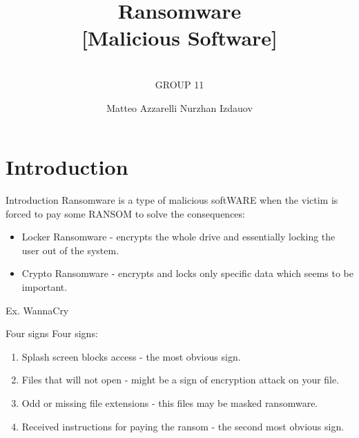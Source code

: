 \documentclass{beamer}
\title{\vspace{1cm}Ransomware\\\Large [Malicious Software]}
\subtitle{\vspace{-0cm}{\large COMP7330 Information Systems Security and Auditing}\\ \vspace{0.5cm} \large GROUP 11}
\author{%
	Matteo Azzarelli \hspace{5cm} Nurzhan Izdauov}
\date{\vspace{2.7cm}\color{black}{\footnotesize{10 April 2019}}}
\begin{document}
    
	\maketitle


 	\section{Introduction}
	
	\begin{frame}{Introduction}
		Ransomware is a type of malicious softWARE when the victim is forced to pay some RANSOM to solve the consequences:

		\begin{itemize}
			\item<2-> Locker Ransomware - encrypts the whole drive and essentially locking the user out of the system.
			\item<3-> Crypto Ransomware - encrypts and locks only specific data which seems to be important.
		\end{itemize}
	\end{frame}
	
	\begin{frame}{Ex. WannaCry}
		\vspace{-0.5cm}
		\begin{center}
		    \end{center}
	\end{frame}
	
	\begin{frame}{Four signs}
	    Four signs:
		\begin{enumerate}[<+->]
			\item Splash screen blocks access - the most obvious sign.
			\item Files that will not open - might be a sign of encryption attack on your file.
            \item Odd or missing file extensions - this files may be masked ransomware.
            \item Received instructions for paying the ransom - the second most obvious sign.
		\end{enumerate}
	\end{frame}
	
\end{document}
